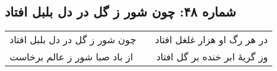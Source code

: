\begin{center}
\section*{شماره ۴۸: چون شور ز گل در دل بلبل افتاد}
\label{sec:048}
\begin{longtable}{l p{0.5cm} r}
چون شور ز گل در دل بلبل افتاد
&&
در هر رگ او هزار غلغل افتاد
\\
از باد صبا شور ز عالم برخاست
&&
وز گریهٔ ابر خنده بر گل افتاد
\\
\end{longtable}
\end{center}
